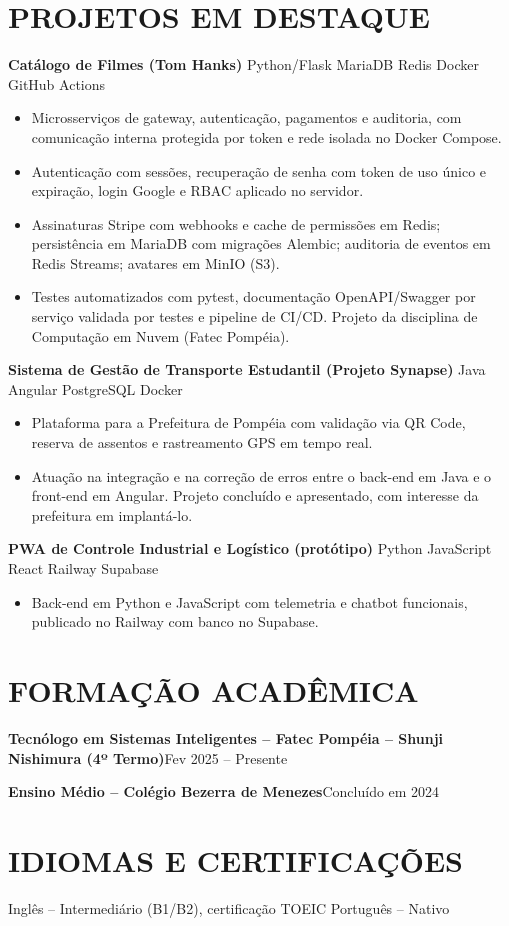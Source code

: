 \documentclass[9pt,a4paper]{extarticle}
\newcommand{\entry}[2]{\vspace{2pt}\noindent\textbf{#1}\hfill{\color{gray}#2}\par}
\newcommand{\projtitle}[2]{\vspace{2pt}\noindent\textbf{#1} {\color{gray}\textperiodcentered{} #2}\par}
\begin{document}
\section*{PROJETOS EM DESTAQUE}
\projtitle{Catálogo de Filmes (Tom Hanks)}{Python/Flask \textperiodcentered{} MariaDB \textperiodcentered{} Redis \textperiodcentered{} Docker \textperiodcentered{} GitHub Actions}
\begin{itemize}
  \item Microsserviços de gateway, autenticação, pagamentos e auditoria, com comunicação interna protegida por token e rede isolada no Docker Compose.
  \item Autenticação com sessões, recuperação de senha com token de uso único e expiração, login Google e RBAC aplicado no servidor.
  \item Assinaturas Stripe com webhooks e cache de permissões em Redis; persistência em MariaDB com migrações Alembic; auditoria de eventos em Redis Streams; avatares em MinIO (S3).
  \item Testes automatizados com pytest, documentação OpenAPI/Swagger por serviço validada por testes e pipeline de CI/CD. Projeto da disciplina de Computação em Nuvem (Fatec Pompéia).
\end{itemize}
\projtitle{Sistema de Gestão de Transporte Estudantil (Projeto Synapse)}{Java \textperiodcentered{} Angular \textperiodcentered{} PostgreSQL \textperiodcentered{} Docker}
\begin{itemize}
  \item Plataforma para a Prefeitura de Pompéia com validação via QR Code, reserva de assentos e rastreamento GPS em tempo real.
  \item Atuação na integração e na correção de erros entre o back-end em Java e o front-end em Angular. Projeto concluído e apresentado, com interesse da prefeitura em implantá-lo.
\end{itemize}
\projtitle{PWA de Controle Industrial e Logístico (protótipo)}{Python \textperiodcentered{} JavaScript \textperiodcentered{} React \textperiodcentered{} Railway \textperiodcentered{} Supabase}
\begin{itemize}
  \item Back-end em Python e JavaScript com telemetria e chatbot funcionais, publicado no Railway com banco no Supabase.
\end{itemize}

\section*{FORMAÇÃO ACADÊMICA}
\entry{Tecnólogo em Sistemas Inteligentes – Fatec Pompéia – Shunji Nishimura (4º Termo)}{Fev 2025 – Presente}
\entry{Ensino Médio – Colégio Bezerra de Menezes}{Concluído em 2024}

\section*{IDIOMAS E CERTIFICAÇÕES}
Inglês – Intermediário (B1/B2), certificação TOEIC \textperiodcentered{} Português – Nativo
\end{document}
